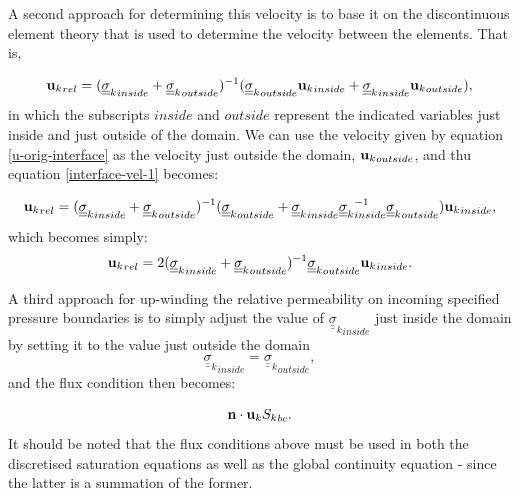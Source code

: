 A second approach for determining this velocity is to base it on the discontinuous element theory
that is used to determine the velocity between the elements. That is,

\begin{equation}
{{\bf u}_k}_{rel}=
({{\underline {\underline \sigma}}_k}_{inside}+{{\underline {\underline \sigma}}_k}_{outside})^{-1}
 (   {{\underline {\underline \sigma}}_k}_{outside} {{\bf u}_k}_{inside}
+{{\underline {\underline \sigma}}_k}_{inside} {{\bf u}_k}_{outside}    ),
\label{interface-vel-1}
\end{equation}
in which the subscripts $inside$ and $outside$ represent the indicated variables just inside
and just outside of the domain. We can use the velocity given by equation \ref{u-orig-interface}
as the velocity just outside the domain, ${{\bf u}_k}_{outside}$, and thu equation \ref{interface-vel-1}
becomes:

\begin{equation}
{{\bf u}_k}_{rel}=
({{\underline {\underline \sigma}}_k}_{inside}+{{\underline {\underline \sigma}}_k}_{outside})^{-1}
 (   {{\underline {\underline \sigma}}_k}_{outside}
+{{\underline {\underline \sigma}}_k}_{inside}   {{\underline {\underline \sigma}}_k}_{inside}^{-1}
{{\underline {\underline \sigma}}_k}_{outside}  ){{\bf u}_k}_{inside},
\label{interface-vel-2}
\end{equation}
which becomes simply:
\begin{equation}
{{\bf u}_k}_{rel}=   2
({{\underline {\underline \sigma}}_k}_{inside}+{{\underline {\underline \sigma}}_k}_{outside})^{-1}
{{\underline {\underline \sigma}}_k}_{outside}   {{\bf u}_k}_{inside}.
\label{interface-vel-3}
\end{equation}

A third approach for up-winding the
relative permeability on incoming specified pressure
boundaries is to simply adjust the value of ${{\underline {\underline \sigma}}_k}_{inside}$
just inside the domain by setting it to the
value just outside the domain
\begin{equation}
{{\underline {\underline \sigma}}_k}_{inside}={{\underline {\underline \sigma}}_k}_{outside} ,
\end{equation}
and the flux
condition then becomes:


\begin{equation}
{\bf n}\cdot{{\bf u}_k} {S_k}_{bc}.
\end{equation}
It should be noted that the flux conditions above
must be used in both the discretised saturation equations
as well as the global continuity equation - since the latter
is a summation of the former.

